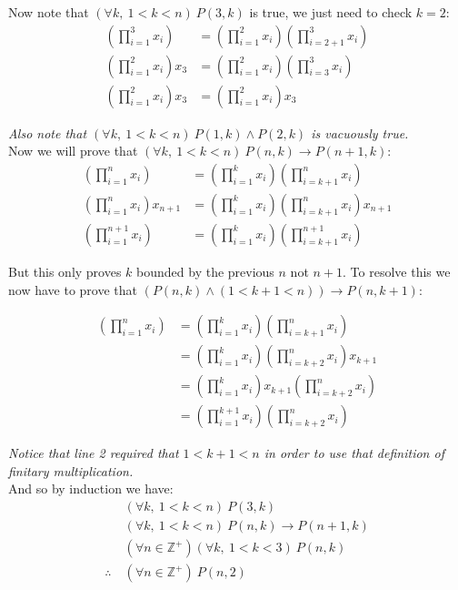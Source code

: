 \documentclass{article}
\begin{document}
Now note that $(\forall k,\ 1<k<n)\ P(3,k)$ is true, we just need to check $k=2$:
\begin{align*}
  \left(\prod^3_{i=1}x_i\right)&=\left(\prod^2_{i=1}x_i\right)\left(\prod^{3}_{i=2+1}x_i\right)\tag*{$P(3,2)$}\\
  \left(\prod^2_{i=1}x_i\right)x_3&=\left(\prod^2_{i=1}x_i\right)\left(\prod^3_{i=3}x_i\right)\tag{def. of finitary multiplication}\\
  \left(\prod^2_{i=1}x_i\right)x_3&=\left(\prod^2_{i=1}x_i\right) x_3\tag{def. of $1$-ary multiplication}
\end{align*}

\textit{Also note that $(\forall k,\ 1<k<n)\ P(1,k)\wedge P(2,k)$ is vacuously true.}\\

Now we will prove that $(\forall k,\ 1<k<n)\ P(n,k)\rightarrow P(n+1,k)$:
\begin{align*}
  \left(\prod^n_{i=1}x_i\right)&=\left(\prod^k_{i=1}x_i\right)\left(\prod^n_{i=k+1}x_i\right)\tag{given}\\
  \left(\prod^n_{i=1}x_i\right)x_{n+1}&=\left(\prod^k_{i=1}x_i\right)\left(\prod^n_{i=k+1}x_i\right)x_{n+1}\\
  \left(\prod^{n+1}_{i=1}x_i\right)&=\left(\prod^k_{i=1}x_i\right)\left(\prod^{n+1}_{i=k+1}x_i\right)\tag{def. of finitary multiplication}
\end{align*}

But this only proves $k$ bounded by the previous $n$ not $n+1$. To resolve this we now have to prove that $(P(n,k)\wedge(1<k+1<n))\rightarrow P(n,k+1)$:

\begin{align*}
  \left(\prod^n_{i=1}x_i\right)&=\left(\prod^k_{i=1}x_i\right)\left(\prod^n_{i=k+1}x_i\right)\tag{given}\\
  &=\left(\prod^k_{i=1}x_i\right)\left(\prod^n_{i=k+2}x_i\right)x_{k+1}\tag{def. of finitary multiplication}\\
  &=\left(\prod^k_{i=1}x_i\right)x_{k+1}\left(\prod^n_{i=k+2}x_i\right)\tag{associativity of $3$-ary mult.}\\
  &=\left(\prod^{k+1}_{i=1}x_i\right)\left(\prod^n_{i=k+2}x_i\right)\tag{def. of finitary multiplication}
\end{align*}

\textit{Notice that line 2 required that $1<k+1<n$ in order to use that definition of finitary multiplication.}\\

And so by induction we have:
\begin{align*}
&(\forall k,\ 1<k<n)\ P(3,k)\\
&(\forall k,\ 1<k<n)\ P(n,k)\rightarrow P(n+1,k)\\
&(\forall n\in \mathbb{Z}^+)(\forall k,\ 1<k<3)\ P(n,k)\tag{special case for 1 \& 2}\\
\therefore\ &(\forall n\in \mathbb{Z}^+)\ P(n,2)\tag{only $k=2$ satisfies this}
\end{align*}
\end{document}
